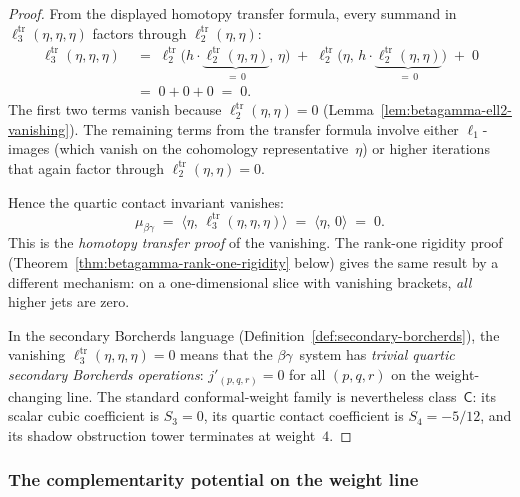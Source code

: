 \begin{proof}
From the displayed homotopy transfer formula, every summand in
$\ell_3^{\mathrm{tr}}(\eta,\eta,\eta)$ factors through
$\ell_2^{\mathrm{tr}}(\eta,\eta)$:
\begin{align*}
 \ell_3^{\mathrm{tr}}(\eta,\eta,\eta)
 &\;=\;
 \ell_2^{\mathrm{tr}}\bigl(
 h \cdot \underbrace{\ell_2^{\mathrm{tr}}(\eta,\eta)}_{=\,0},\,
 \eta\bigr)
 \;+\;
 \ell_2^{\mathrm{tr}}\bigl(
 \eta,\,
 h \cdot \underbrace{\ell_2^{\mathrm{tr}}(\eta,\eta)}_{=\,0}\bigr)
 \;+\; 0 \\[4pt]
 &\;=\; 0 + 0 + 0 \;=\; 0.
\end{align*}
The first two terms vanish because
$\ell_2^{\mathrm{tr}}(\eta,\eta) = 0$
(Lemma~\ref{lem:betagamma-ell2-vanishing}).
The remaining terms from the transfer formula involve either
$\ell_1$-images (which vanish on the cohomology representative~$\eta$)
or higher iterations that again factor through
$\ell_2^{\mathrm{tr}}(\eta,\eta) = 0$.

Hence the quartic contact invariant vanishes:
\[
 \mu_{\beta\gamma}
 \;=\;
 \langle \eta,\, \ell_3^{\mathrm{tr}}(\eta,\eta,\eta) \rangle
 \;=\;
 \langle \eta,\, 0 \rangle
 \;=\; 0.
\]
This is the \emph{homotopy transfer proof} of the vanishing.
The rank-one rigidity proof
(Theorem~\ref{thm:betagamma-rank-one-rigidity} below)
gives the same result by a different mechanism:
on a one-dimensional slice with vanishing brackets,
\emph{all} higher jets are zero.

In the secondary Borcherds language
(Definition~\ref{def:secondary-borcherds}), the vanishing
$\ell_3^{\mathrm{tr}}(\eta,\eta,\eta) = 0$ means that the
$\beta\gamma$~system has \emph{trivial quartic secondary Borcherds
operations}: $j'_{(p,q,r)} = 0$ for all $(p,q,r)$ on the
weight-changing line. The standard conformal-weight family is
nevertheless class~$\mathsf C$: its scalar cubic coefficient is
$S_3=0$, its quartic contact coefficient is $S_4=-5/12$, and its
shadow obstruction tower terminates at weight~$4$.
\end{proof}

\subsubsection{The complementarity potential on the weight line}
\label{sssec:betagamma-potential-weight-line}

